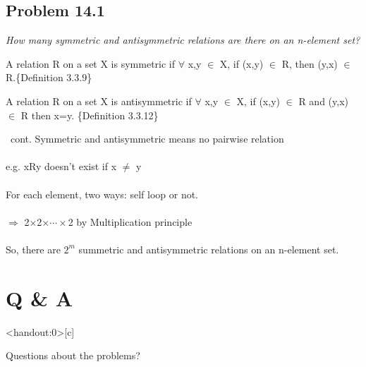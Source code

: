 \documentclass{beamer}
\begin{document}
        
        
    \subsection{Problem 14.1}
    
        \begin{frame}[c,shrink]{\subsecname}
            \textit{How many symmetric and antisymmetric relations are there on an n-element
set?}\\\pause
                \begin{definition}
			    A relation R on a set X is \alert{symmetric} if $\forall$ x,y $\in$ X, if (x,y) $\in$ R, then (y,x) $\in$ R.\{Definition 3.3.9\}
                \end{definition}\pause
                \begin{definition}
			    A relation R on a set X is \alert{antisymmetric} if $\forall$ x,y $\in$ X, if (x,y) $\in$ R and (y,x) $\in$ R then x=y. \{Definition 3.3.12\}
                \end{definition}
        \end{frame}
    
        \begin{frame}[c]{\subsecname\ cont.}
            Symmetric and antisymmetric means \alert{no pairwise relation}\\$\;$\\\pause
            e.g. xRy doesn't exist if x $\neq$ y\\$\;$\\\pause
            For each element, two ways: self loop or not.\\$\;$\\\pause
            $\Rightarrow$ 2$\times$2$\times\cdots\times$2 by Multiplication principle\\$\;$\\\pause
            So, there are $2^m$ summetric and antisymmetric relations on an n-element set. 
        \end{frame}
        
        
        
\section*{Q \& A}

    \begin{frame}<handout:0>[c]{\secname}
        \centerline{\Huge{Questions about the problems?}}
    \end{frame}
    
    
    
\end{document}
